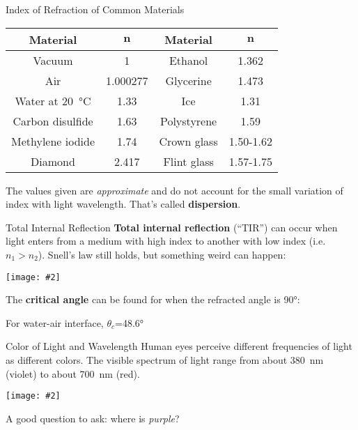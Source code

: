 \documentclass[compress,aspectratio=169]{beamer}
\newcommand{\pic}[2]{\texttt{[image: \#2]}}
\newcommand{\eq}[2]{\vspace{#1}{\LARGE\begin{displaymath}#2\end{displaymath}}}
\begin{document}
\begin{frame}{Index of Refraction of Common Materials}
  \begin{center}
    \begin{tabular}{c|c||c|c}
      \rowcolor{pink}
      \textbf{Material} & $\bm{n}$ & \textbf{Material} & $\bm{n}$\\ \hline
      Vacuum           & 1        & Ethanol     & 1.362 \\
      Air              & 1.000277 & Glycerine   & 1.473 \\
      Water at \SI{20}{\celsius} & 1.33 & Ice         & 1.31 \\
      Carbon disulfide & 1.63     & Polystyrene & 1.59 \\
      Methylene iodide & 1.74     & Crown glass & 1.50-1.62\\
      Diamond          & 2.417    & Flint glass & 1.57-1.75\\
    \end{tabular}
  \end{center}
  The values given are \emph{approximate} and do not account for the small
  variation of index with light wavelength. That's called \textbf{dispersion}.
\end{frame}



\begin{frame}{Total Internal Reflection}
  \textbf{Total internal reflection} (``TIR'') can occur when light enters from
  a medium with high index to another with low index (i.e.\ $n_1>n_2$).
  Snell's law still holds, but something weird can happen:
  \begin{center}
    \pic{.55}{graphics/660px-RefractionReflextion.png}
  \end{center}
  The \textbf{critical angle} can be found for when the refracted angle is
  \ang{90}:

  \eq{-.2in}{
    \boxed{\theta_c=\frac{n_2}{n_1}}
  }
  For water-air interface, $\theta_c$=\ang{48.6}
\end{frame}



\begin{frame}{Color of Light and Wavelength}
  Human eyes perceive different frequencies of light as different colors. The
  visible spectrum of light range from about \SI{380}{\nano\metre} (violet) to
  about \SI{700}{\nano\metre} (red).
  \begin{center}
    \pic{.75}{graphics/electromagneticspectrum-141b490bac872789434.png}
  \end{center}
  A good question to ask: where is \emph{purple}?
\end{frame}
\end{document}
